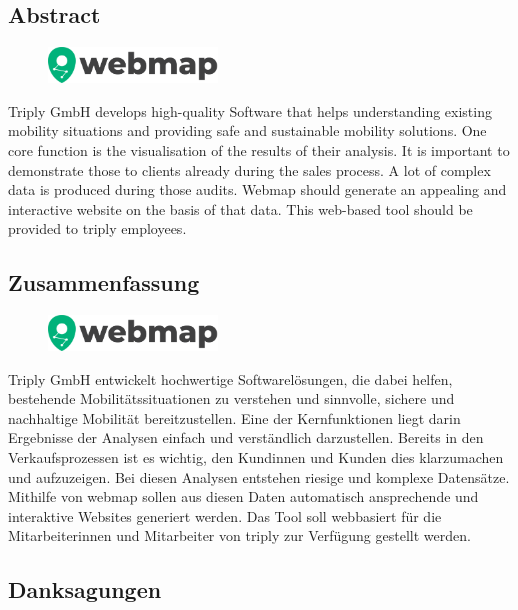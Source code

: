 \begin{spacing}{1}
    \chapter*{Abstract}
\end{spacing}
\begin{figure}
    \begin{center}
      \includegraphics[width=0.4\textwidth]{pics/webmap_logo}
    \end{center}
\end{figure}
Triply GmbH develops high-quality Software that helps understanding existing mobility situations and providing safe and sustainable mobility solutions.
One core function is the visualisation of the results of their analysis.
It is important to demonstrate those to clients already during the sales process.
A lot of complex data is produced during those audits.
Webmap should generate an appealing and interactive website on the basis of that data.
This web-based tool should be provided to triply employees.
\newpage
\begin{spacing}{1}
    \chapter*{Zusammenfassung}
\end{spacing}
\begin{figure}
    \begin{center}
      \includegraphics[width=0.4\textwidth]{pics/webmap_logo}
    \end{center}
\end{figure}
Triply GmbH entwickelt hochwertige Softwarelösungen, die dabei helfen,
bestehende Mobilitätssituationen zu verstehen und sinnvolle, sichere und
nachhaltige Mobilität bereitzustellen.
Eine der Kernfunktionen liegt darin Ergebnisse der Analysen einfach und verständlich darzustellen.
Bereits in den Verkaufsprozessen ist es wichtig, den Kundinnen und Kunden dies klarzumachen und aufzuzeigen.
Bei diesen Analysen entstehen riesige und komplexe Datensätze.
Mithilfe von webmap sollen aus diesen Daten automatisch ansprechende und interaktive Websites generiert werden.
Das Tool soll webbasiert für die Mitarbeiterinnen und Mitarbeiter von triply zur Verfügung gestellt werden.

\newpage
\begin{spacing}{1}
    \chapter{Danksagungen}
\end{spacing}
